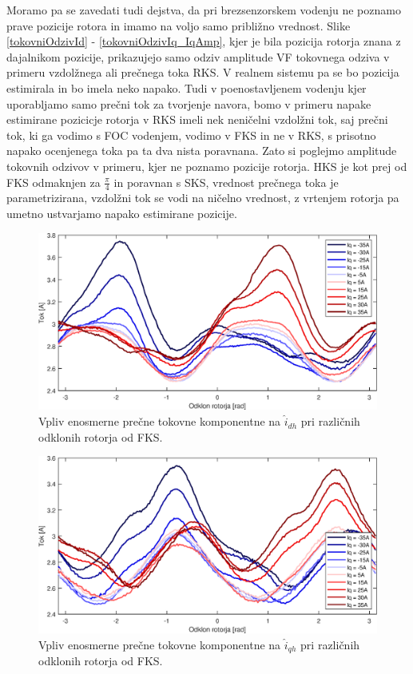 \documentclass[a4paper,twoside,openright,12pt,slovene]{book}
\begin{document}
\newpage 
Moramo pa se zavedati tudi dejstva, da pri brezsenzorskem vodenju ne poznamo prave pozicije rotora in imamo na voljo samo približno vrednost. Slike \ref{tokovniOdzivId} - \ref{tokovniOdzivIq_IqAmp},
kjer je bila pozicija rotorja znana z dajalnikom pozicije, prikazujejo samo odziv amplitude VF tokovnega odziva v primeru vzdolžnega ali prečnega toka RKS. V realnem sistemu pa se bo pozicija
estimirala in bo imela neko napako. Tudi v poenostavljenem vodenju kjer uporabljamo samo prečni tok za tvorjenje navora, bomo v primeru napake estimirane pozicicje rotorja v RKS imeli nek neničelni
vzdolžni tok, saj prečni tok, ki ga vodimo s FOC vodenjem, vodimo v FKS in ne v RKS, s prisotno napako ocenjenega toka pa ta dva nista poravnana. Zato si poglejmo amplitude tokovnih odzivov v primeru,
kjer ne poznamo pozicije rotorja. HKS je kot prej od FKS odmaknjen za $\frac{\pi}{4}$ in poravnan s SKS, vrednost prečnega toka je parametrizirana, vzdolžni tok se vodi na ničelno vrednost, z vrtenjem
rotorja pa umetno ustvarjamo napako estimirane pozicije.

\begin{figure}[!htbp]
    \centering
    \includegraphics[width=0.95\columnwidth]{Slike/tokovniOdzivIs_IdAmp.eps}
    \caption{\label{tokovniOdzivIs_IdAmp} Vpliv enosmerne prečne tokovne komponentne na $\hat{i}_{dh}$ pri različnih odklonih rotorja od FKS.}
\end{figure}

\begin{figure}[!htbp]
    \centering
    \includegraphics[width=0.95\columnwidth]{Slike/tokovniOdzivIs_IqAmp.eps}
    \caption{\label{tokovniOdzivIs_IqAmp} Vpliv enosmerne prečne tokovne komponentne na $\hat{i}_{qh}$ pri različnih odklonih rotorja od FKS.}
\end{figure}
\end{document}
